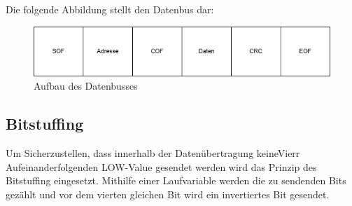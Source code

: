 Die folgende Abbildung stellt den Datenbus dar:
\begin{figure}[H]
	\centering    
	\includegraphics[width=1\textwidth]{Bilder/datenbus.png}
	\caption{Aufbau des Datenbusses}
	\label{Datenbus}
\end{figure}

\subsection{Bitstuffing}
Um Sicherzustellen, dass innerhalb der Datenübertragung keineVierr Aufeinanderfolgenden LOW-Value gesendet werden wird das Prinzip des Bitstuffing eingesetzt. Mithilfe einer Laufvariable werden die zu sendenden Bits gezählt und vor dem vierten gleichen Bit wird ein invertiertes Bit gesendet.